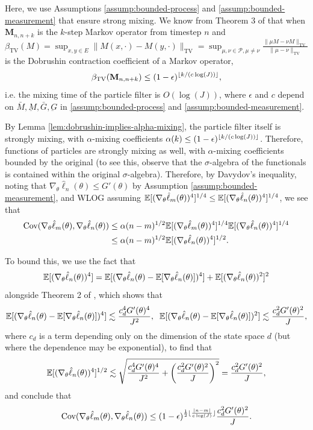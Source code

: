 \documentclass{article}
\begin{document}
Here, we use Assumptions \ref{assump:bounded-process} and \ref{assump:bounded-measurement} that ensure strong mixing. We know from Theorem 3 of \cite{karjalainen2023} that when $\textbf{M}_{n,n+k}$ is the $k$-step Markov operator from timestep $n$ and $\beta_{\text{TV}}(M) = \sup _{x, y \in E}\|M(x, \cdot)-M(y, \cdot)\|_{\mathrm{TV}}=\sup _{\mu, \nu \in \mathcal{P}, \mu \neq \nu} \frac{\|\mu M-\nu M\|_{\mathrm{TV}}}{\|\mu-\nu\|_{\mathrm{TV}}}$ is the Dobrushin contraction coefficient of a Markov operator, 
$$\beta_{\text{TV}}(\textbf{M}_{n,n+k}) \leq (1-\epsilon)^{\lfloor k/(c\log(J)) \rfloor},$$
i.e. the mixing time of the particle filter is $O(\log(J))$, where $\epsilon$ and $c$ depend on $\bar{M}, \underbar{M}, \bar{G}, \underbar{G}$ in \ref{assump:bounded-process} and \ref{assump:bounded-measurement}. 


By Lemma \ref{lem:dobrushin-implies-alpha-mixing}, the particle filter itself is strongly mixing, with $\alpha$-mixing coefficients $\alpha(k) \leq (1-\epsilon)^{\lfloor k/(c\log(J)) \rfloor}$. Therefore, functions of particles are strongly mixing as well, with $\alpha$-mixing coefficients bounded by the original (to see this, observe that the $\sigma$-algebra of the functionals is contained within the original $\sigma$-algebra). Therefore, by Davydov's inequality, noting that $\nabla_\theta\hat\ell_n(\theta)\leq G'(\theta)$ by Assumption \ref{assump:bounded-measurement}, and WLOG assuming $\mathbb{E}[(\nabla_\theta\hat\ell_m(\theta))^4]^{1/4}\leq\mathbb{E}[(\nabla_\theta\hat\ell_n(\theta))^4]^{1/4}$, we see that
\begin{align*}
    \text{Cov}(\nabla_\theta\hat\ell_m(\theta), \nabla_\theta\hat\ell_n(\theta)) 
    &\leq \alpha(n-m)^{1/2}\mathbb{E}[(\nabla_\theta\hat\ell_m(\theta))^4]^{1/4}\mathbb{E}[(\nabla_\theta\hat\ell_n(\theta))^4]^{1/4}\\
    &\leq \alpha(n-m)^{1/2}\mathbb{E}[(\nabla_\theta\hat\ell_n(\theta))^4]^{1/2}.
\end{align*}

To bound this, we use the fact that $$\mathbb{E}[(\nabla_\theta\hat\ell_n(\theta))^4] = \mathbb{E}[(\nabla_\theta\hat\ell_n(\theta)-\mathbb{E}[\nabla_\theta\hat\ell_n(\theta)])^4]+\mathbb{E}[(\nabla_\theta\hat\ell_n(\theta))^2]^2$$
alongside Theorem 2 of \cite{delMoral03}, which shows that
$$\mathbb{E}[(\nabla_\theta\hat\ell_n(\theta)-\mathbb{E}[\nabla_\theta\hat\ell_n(\theta)])^4] \lesssim \frac{c_d^4G'(\theta)^4}{J^2}, \;\; \mathbb{E}[(\nabla_\theta\hat\ell_n(\theta)-\mathbb{E}[\nabla_\theta\hat\ell_n(\theta)])^2] \lesssim \frac{c_d^2G'(\theta)^2}{J},$$
where $c_d$ is a term depending only on the dimension of the state space $d$ (but where the dependence may be exponential), to find that 
$$\mathbb{E}[(\nabla_\theta\hat\ell_n(\theta))^4]^{1/2} \lesssim  \sqrt{\frac{c_d^4G'(\theta)^4}{J^2}+\left(\frac{c_d^2G'(\theta)^2}{J}\right)^2} = \frac{c_d^2G'(\theta)^2}{J},$$
and conclude that 
$$\text{Cov}(\nabla_\theta\hat\ell_m(\theta), \nabla_\theta\hat\ell_n(\theta)) \leq (1-\epsilon)^{\frac{1}{2}\lfloor \frac{|n-m|}{c\log(J)} \rfloor}\frac{c_d^2G'(\theta)^2}{J}.$$
\end{document}
